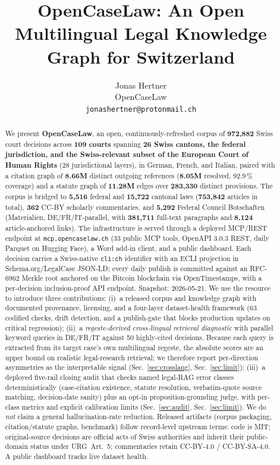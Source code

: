 \documentclass[11pt,a4paper]{article}
\title{OpenCaseLaw: An Open Multilingual Legal Knowledge Graph for Switzerland}
\author{%
  Jonas Hertner \\
  OpenCaseLaw \\
  \texttt{jonashertner@protonmail.ch}
}
\begin{document}
\maketitle

\begin{abstract}
We present \textbf{OpenCaseLaw}, an open, continuously-refreshed corpus of \textbf{972{,}882} Swiss court decisions across \textbf{109 courts} spanning \textbf{26 Swiss cantons, the federal jurisdiction, and the Swiss-relevant subset of the European Court of Human Rights} (28 jurisdictional layers), in German, French, and Italian, paired with a citation graph of \textbf{8.66M} distinct outgoing references (\textbf{8.05M} resolved, 92.9\,\% coverage) and a statute graph of \textbf{11.28M} edges over \textbf{283{,}330} distinct provisions. The corpus is bridged to \textbf{5{,}516} federal and \textbf{15{,}722} cantonal laws (\textbf{753{,}842} articles in total), \textbf{362} CC-BY scholarly commentaries, and \textbf{5{,}292} Federal Council Botschaften (Materialien, DE/FR/IT-parallel, with \textbf{381{,}711} full-text paragraphs and \textbf{8{,}124} article-anchored links). The infrastructure is served through a deployed MCP/REST endpoint at \texttt{mcp.opencaselaw.ch} (33 public MCP tools, OpenAPI 3.0.3 REST, daily Parquet on Hugging Face), a Word add-in client, and a public dashboard. Each decision carries a Swiss-native \texttt{cli:ch} identifier with an ECLI projection in Schema.org/LegalCase JSON-LD; every daily publish is committed against an RFC-6962 Merkle root anchored on the Bitcoin blockchain via OpenTimestamps, with a per-decision inclusion-proof API endpoint. Snapshot: 2026-05-21. We use the resource to introduce three contributions:
(i)~a released corpus and knowledge graph with documented provenance, licensing, and a four-layer dataset-health framework (63 codified checks, drift detection, and a publish-gate that blocks production updates on critical regression);
(ii)~a \emph{regeste-derived cross-lingual retrieval diagnostic} with parallel keyword queries in DE/FR/IT against 50 highly-cited decisions. Because each query is extracted from its target case's own multilingual regeste, the absolute scores are an upper bound on realistic legal-research retrieval; we therefore report per-direction asymmetries as the interpretable signal (Sec.~\ref{sec:crosslang}, Sec.~\ref{sec:limit});
(iii)~a deployed five-rail closing audit that checks named legal-RAG error classes deterministically (case-citation existence, statute resolution, verbatim-quote source matching, decision-date sanity) plus an opt-in proposition-grounding judge, with per-class metrics and explicit calibration limits (Sec.~\ref{sec:audit}, Sec.~\ref{sec:limit}). We do \emph{not} claim a general hallucination-rate reduction.
Released artifacts (corpus packaging, citation/statute graphs, benchmark) follow record-level upstream terms: code is MIT; original-source decisions are official acts of Swiss authorities and inherit their public-domain status under URG~Art.~5; commentaries retain CC-BY-4.0 / CC-BY-SA-4.0. A public dashboard tracks live dataset health.
\end{abstract}
\end{document}
